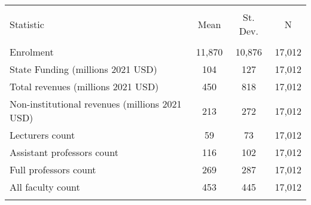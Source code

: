 
\begin{tabular}{@{\extracolsep{5pt}}lccc} 
\\[-1.8ex]\hline 
\hline \\[-1.8ex] 
Statistic & \multicolumn{1}{c}{Mean} & \multicolumn{1}{c}{St. Dev.} & \multicolumn{1}{c}{N} \\ 
\hline \\[-1.8ex] 
Enrolment & 11,870 & 10,876 & 17,012 \\ 
State Funding (millions 2021 USD) & 104 & 127 & 17,012 \\ 
Total revenues (millions 2021 USD) & 450 & 818 & 17,012 \\ 
Non-institutional revenues (millions 2021 USD) & 213 & 272 & 17,012 \\ 
Lecturers count & 59 & 73 & 17,012 \\ 
Assistant professors count & 116 & 102 & 17,012 \\ 
Full professors count & 269 & 287 & 17,012 \\ 
All faculty count & 453 & 445 & 17,012 \\ 
\hline \\[-1.8ex] 
\end{tabular} 
